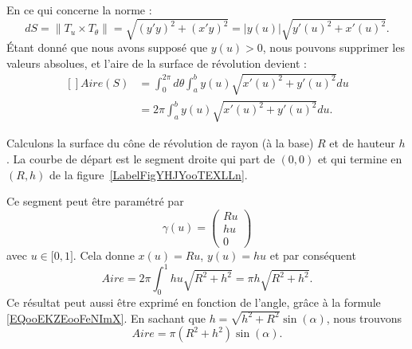 En ce qui concerne la norme :
\begin{equation}
	dS=\| T_u\times T_{\theta} \|=\sqrt{(y'y)^2+(x'y)^2}=| y(u) |\sqrt{y'(u)^2+x'(u)^2}.
\end{equation}
Étant donné que nous avons supposé que \( y(u)>0\), nous pouvons supprimer les valeurs absolues, et l'aire de la surface de révolution devient :
\begin{equation}
	\begin{aligned}[]
		Aire(S) & =\int_0^{2\pi}d\theta\int_a^b y(u)\sqrt{x'(u)^2+y'(u)^2}du \\
		        & =2\pi\int_a^b y(u)\sqrt{x'(u)^2+y'(u)^2}du.
	\end{aligned}
\end{equation}

\begin{example}     \label{EXooZCLXooVmXQgY}
	Calculons la surface du cône de révolution de rayon (à la base) \( R\) et de hauteur \( h\). La courbe de départ est le segment droite qui part de \( (0,0)\) et qui termine en \( (R,h)\) de la figure~\ref{LabelFigYHJYooTEXLLn}. %
	\newcommand{\CaptionFigYHJYooTEXLLn}{En faisant tourner cette droite autour de l'axe \( X\), nous obtenons un cône.}
	

	Ce segment peut être paramétré par
	\begin{equation}
		\gamma(u)=\begin{pmatrix}
			Ru \\
			hu \\
			0
		\end{pmatrix}
	\end{equation}
	avec \( u\in\mathopen[ 0 , 1 \mathclose]\). Cela donne \( x(u)=Ru\), \( y(u)=hu\) et par conséquent
	\begin{equation}
		Aire=2\pi\int_0^1hu\sqrt{R^2+h^2}=\pi h\sqrt{R^2+h^2}.
	\end{equation}
	Ce résultat peut aussi être exprimé en fonction de l'angle, grâce à la formule \eqref{EQooEKZEooFeNImX}. En sachant que \( h=\sqrt{h^2+R^2}\sin(\alpha)\), nous trouvons
	\begin{equation}
		Aire=\pi(R^2+h^2)\sin(\alpha).
	\end{equation}

\end{example}

